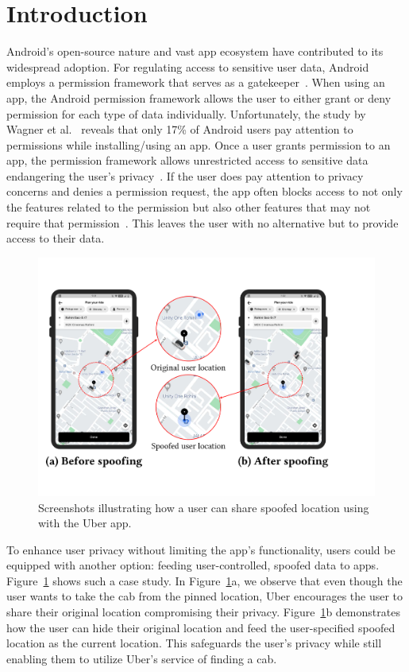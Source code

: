 \section{Introduction}
\label{sec:introduction}

Android's open-source nature and vast app ecosystem have contributed to its widespread adoption. For regulating access to sensitive user data, Android employs a permission framework that serves as a gatekeeper~\cite{alkindi2019android}. When using an app, the Android permission framework allows the user to either grant or deny permission for each type of data individually. Unfortunately, the study by Wagner et al.~\cite{ha2013android} reveals that only 17\% of Android users pay attention to permissions while installing/using an app. Once a user grants permission to an app, the permission framework allows unrestricted access to sensitive data endangering the user's privacy~\cite{alkindi2019android}. If the user does pay attention to privacy concerns and denies a permission request, the app often blocks access to not only the features related to the permission but also other features that may not require that permission~\cite{alkindi2019android}. This leaves the user with no alternative but to provide access to their data.

\begin{figure}[t]
    \centering
    \includegraphics[width=0.75\linewidth]{Figures/Case Studies/uber_screenshots.pdf}
    \caption{Screenshots illustrating how a user can share spoofed location using \framework{} with the Uber app.}
    \label{fig:intro_case_study_uber}
    \vspace{-10pt}
\end{figure}

To enhance user privacy without limiting the app's functionality, users could be equipped with another option: feeding user-controlled, spoofed data to apps. Figure~\ref{fig:intro_case_study_uber} shows such a case study. In Figure~\ref{fig:intro_case_study_uber}a, we observe that even though the user wants to take the cab from the pinned location, Uber encourages the user to share their original location compromising their privacy. Figure~\ref{fig:intro_case_study_uber}b demonstrates how the user can hide their original location and feed the user-specified spoofed location as the current location. This safeguards the user's privacy while still enabling them to utilize Uber's service of finding a cab.

